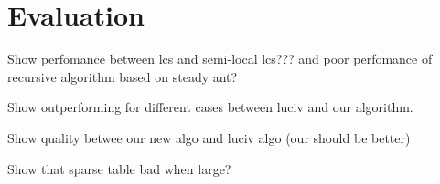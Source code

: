 \section*{Evaluation}
\label{section:evaluation}
Show perfomance between lcs and semi-local lcs??? and poor perfomance of recursive algorithm based on steady ant?

Show outperforming for different cases between luciv and our algorithm.

Show quality betwee our new algo and  luciv algo (our should be better)

Show that sparse table bad when large?
 
